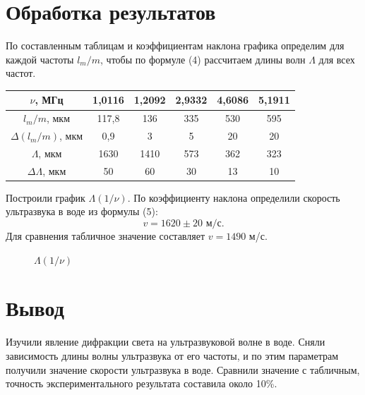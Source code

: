 \documentclass[a4paper,12pt]{article} %
\begin{document}
	\section{Обработка результатов}
	По составленным таблицам и коэффициентам наклона графика определим для каждой частоты $l_m/m$, чтобы по формуле (4) рассчитаем длины волн $\Lambda$ для всех частот.
	\begin{center}
	    \begin{tabular}{|c|c|c|c|c|c|}
	         \hline
	         $\nu$, МГц & 1,0116 & 1,2092 & 2,9332 & 4{,}6086 & 5{,}1911 \\ \hline
	         $l_m/m$, мкм & 117{,}8 & 136 & 335 & 530 & 595 \\ \hline
	         $\Delta(l_m/m)$, мкм &  0{,}9 & 3 & 5 & 20 & 20 \\ \hline
	         $\Lambda$, мкм & 1630 & 1410 & 573 & 362 & 323 \\ \hline
	         $\Delta\Lambda$, мкм & 50 & 60 & 30 & 13 & 10 \\ \hline
	    \end{tabular}
	\end{center}
	Построили график $\Lambda(1/\nu)$. По коэффициенту наклона определили скорость ультразвука в воде из формулы (5):
	$$v=1620\pm20\text{ м/с}.$$
	Для сравнения табличное значение составляет $v=1490$ м/с.
	\begin{figure}[!htb] \centering
		\caption{$\Lambda(1/\nu)$}
	\end{figure}
    \section{Вывод}
	Изучили явление дифракции света на ультразвуковой волне в воде. Сняли зависимость длины волны ультразвука от его частоты, и по этим параметрам получили значение скорости ультразвука в воде. Сравнили значение с табличным, точность экспериментального результата составила около 10\%.
\end{document}
